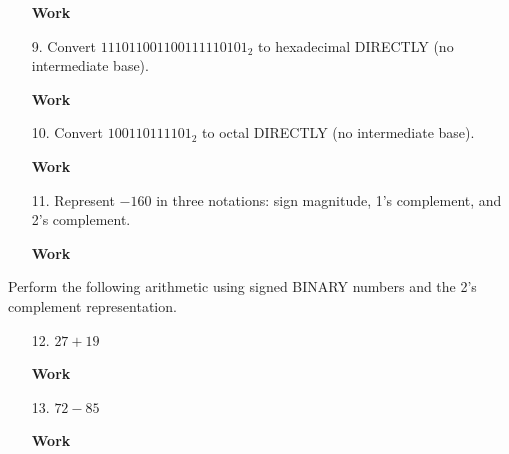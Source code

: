 \documentclass[12pt]{article}
\begin{document}
\begin{enumerate}
  \item[\textbf{Work}]
\end{enumerate}


\begin{enumerate}
\item[9.] Convert $111011001100111110101_2$ to hexadecimal DIRECTLY (no intermediate base).
\end{enumerate}

\begin{enumerate}
  \item[\textbf{Work}]
\end{enumerate}


\begin{enumerate}
\item[10.] Convert $100110111101_2$ to octal DIRECTLY (no intermediate base).
\end{enumerate}

\begin{enumerate}
  \item[\textbf{Work}]
\end{enumerate}


\begin{enumerate}
\item[11.] Represent $-160$ in three notations: sign magnitude, 1’s complement, and 2’s complement.
\end{enumerate}

\begin{enumerate}
  \item[\textbf{Work}]
\end{enumerate}

\noindent Perform the following arithmetic using signed BINARY numbers and the 2’s complement representation.
\begin{enumerate}
\item[12.] $27+19$
\end{enumerate}

\begin{enumerate}
  \item[\textbf{Work}]
\end{enumerate}


\begin{enumerate}
\item[13.] $72-85$
\end{enumerate}

\begin{enumerate}
  \item[\textbf{Work}]
\end{enumerate}
\end{document}
